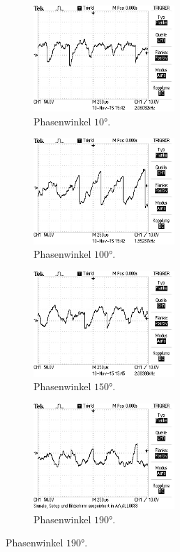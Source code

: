 \begin{figure}
\centering
\begin{subfigure}{0.48\textwidth}
\centering
\includegraphics[height=4cm]{Bilder/r/r10.JPG}
\caption{Phasenwinkel $10°$.}
\label{fig:rp10}
\end{subfigure}
\begin{subfigure}{0.48\textwidth}
\centering
\includegraphics[height=4cm]{Bilder/r/r100.JPG}
\caption{Phasenwinkel $100°$.}
\label{fig:rp100}
\end{subfigure}
\begin{subfigure}{0.48\textwidth}
\centering
\includegraphics[height=4cm]{Bilder/r/r150.JPG}
\caption{Phasenwinkel $150°$.}
\label{fig:rp150}
\end{subfigure}
\begin{subfigure}{0.48\textwidth}
\centering
\includegraphics[height=4cm]{Bilder/r/r190.JPG}
\caption{Phasenwinkel $190°$.}

\end{subfigure}
\end{figure}
